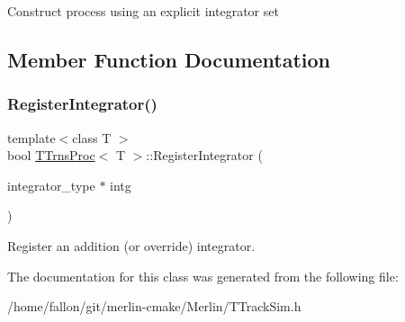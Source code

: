 Construct process using an explicit integrator set 

\subsection{Member Function Documentation}
\mbox{\label{classTTrnsProc_ac8fea60c9ccdfc1ae17f3a90f181e54b}} 
\subsubsection{\texorpdfstring{Register\+Integrator()}{RegisterIntegrator()}}
{\footnotesize\ttfamily template$<$class T $>$ \\
bool \hyperlink{classTTrnsProc}{T\+Trns\+Proc}$<$ T $>$\+::Register\+Integrator (\begin{DoxyParamCaption}\item[{integrator\+\_\+type $\ast$}]{intg }\end{DoxyParamCaption})\hspace{0.3cm}{\ttfamily [inline]}}

Register an addition (or override) integrator. 

The documentation for this class was generated from the following file\+:\begin{DoxyCompactItemize}
\item 
/home/fallon/git/merlin-\/cmake/\+Merlin/T\+Track\+Sim.\+h\end{DoxyCompactItemize}

